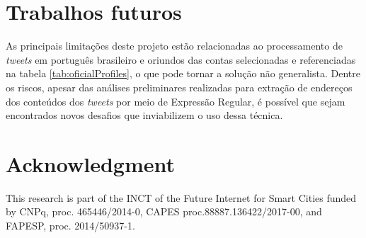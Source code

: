 \documentclass[
	12pt,				%
	oneside,			%
	a4paper,			%
	english,			%
	brazil				%
	]{abntex2ppgsi}
\begin{document}
\section{Trabalhos futuros}
As principais limitações deste projeto estão relacionadas ao processamento de \textit{tweets} em português brasileiro e oriundos das contas selecionadas e referenciadas na tabela \ref{tab:oficialProfiles}, o que pode tornar a solução não generalista. Dentre os riscos, apesar das análises preliminares realizadas para extração de endereços dos conteúdos dos \textit{tweets} por meio de Expressão Regular, é possível que sejam encontrados novos desafios que inviabilizem o uso dessa técnica.

\section*{Acknowledgment}
This research is part of the INCT of the Future Internet for Smart Cities funded by CNPq, proc. 465446/2014-0, CAPES proc.88887.136422/2017-00, and FAPESP, proc. 2014/50937-1.

\postextual

\listoftodos[Notes]


%
%

\end{document}
